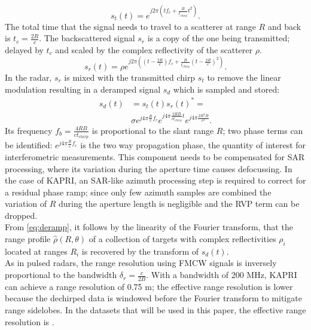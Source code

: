 \begin{equation}
	s_t\left(t\right) = e^{j 2 \pi \left( t f_{c} +  \frac{B}{t_{chirp}} t^2 \right)}.
\end{equation}
The total time that the signal needs to travel to a scatterer at range $R$ and back is $t_{c} = \frac{2 R}{c}$. The backscattered signal $s_r$ is a copy of the one being transmitted; delayed by $t_{c}$ and scaled by the complex reflectivity of the scatterer $\rho$.
\begin{equation}
		s_r\left(t\right) = \rho e^{j 2 \pi \left( \left(t - \frac{2 R}{c}\right) f_{c} +  \frac{B}{t_{chirp}} \left(t - \frac{2 R}{c}\right)^2 \right)}.
\end{equation}
In the radar, $s_r$ is mixed with the transmitted chirp $s_t$  to remove the linear modulation resulting in a deramped signal $s_d$ which is sampled and stored: 
\begin{equation}\label{eq:deramp}
	\begin{aligned}
	s_{d}\left(t\right) &=s_t\left(t\right)s_r\left(t\right)^* =\\ 
	&\sigma e^{j 4 \pi \frac{ R}{c}f_c}  e^{j 4 \pi \frac{2 R B }{c t_{chirp}} t}  e^{j 4 \pi \frac{2 R^2 B}{c^2}}.
	\end{aligned}
\end{equation} 
Its frequency $f_{b} = \frac{4 R B}{c t_{chirp}}$ is proportional to the slant range $R$;
two phase terms can be identified: $ e^{j 4 \pi \frac{R}{c}f_c}$ is the two way propagation phase, the quantity of interest for  interferometric measurements. This component needs to be compensated for SAR processing, where its variation during the aperture time causes defocussing. In the case of KAPRI, an SAR-like azimuth processing step is required to correct for a residual phase ramp; since only few azimuth samples are combined the variation of $R$ during the aperture length is negligible and the RVP term can be dropped.\\
From \autoref{eq:deramp}, it follows by the linearity of the Fourier transform, that the range profile $\hat{\rho}\left(R, \theta\right)$ of a collection of targets with complex reflectivities $\rho_i$ located at ranges $R_{i}$ is recovered by the transform of $s_{d}\left(t\right)$.\\
As in pulsed radars, the range resolution using FMCW signals is inversely proportional to the bandwidth $\delta_{r} = \frac{c}{2 B}$. With a bandwidth of 200 MHz, KAPRI can achieve a range resolution of 0.75 m\cite{Strozzi2011}; the effective range resolution is lower because the dechirped data is windowed before the Fourier transform to mitigate range sidelobes. In the datasets that will be used in this paper, the effective range resolution is .\\
